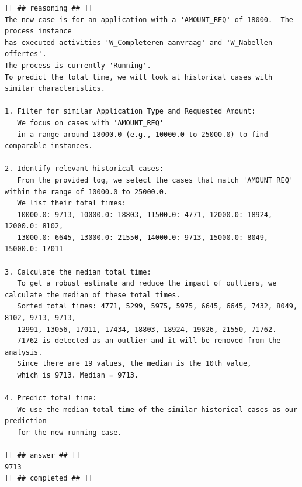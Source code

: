 \begin{lstlisting}
[[ ## reasoning ## ]]
The new case is for an application with a 'AMOUNT_REQ' of 18000.  The process instance 
has executed activities 'W_Completeren aanvraag' and 'W_Nabellen offertes'.
The process is currently 'Running'. 
To predict the total time, we will look at historical cases with similar characteristics.

1. Filter for similar Application Type and Requested Amount:
   We focus on cases with 'AMOUNT_REQ' 
   in a range around 18000.0 (e.g., 10000.0 to 25000.0) to find comparable instances.

2. Identify relevant historical cases:
   From the provided log, we select the cases that match 'AMOUNT_REQ' within the range of 10000.0 to 25000.0. 
   We list their total times:
   10000.0: 9713, 10000.0: 18803, 11500.0: 4771, 12000.0: 18924, 12000.0: 8102,
   13000.0: 6645, 13000.0: 21550, 14000.0: 9713, 15000.0: 8049, 15000.0: 17011

3. Calculate the median total time:
   To get a robust estimate and reduce the impact of outliers, we calculate the median of these total times.
   Sorted total times: 4771, 5299, 5975, 5975, 6645, 6645, 7432, 8049, 8102, 9713, 9713, 
   12991, 13056, 17011, 17434, 18803, 18924, 19826, 21550, 71762.
   71762 is detected as an outlier and it will be removed from the analysis.
   Since there are 19 values, the median is the 10th value,
   which is 9713. Median = 9713.

4. Predict total time:
   We use the median total time of the similar historical cases as our prediction
   for the new running case.

[[ ## answer ## ]]
9713
[[ ## completed ## ]]
\end{lstlisting}